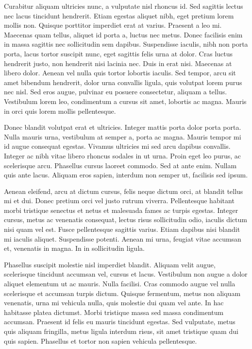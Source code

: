 Curabitur aliquam ultricies nunc, a vulputate nisl rhoncus id. Sed
sagittis lectus nec lacus tincidunt hendrerit. Etiam egestas aliquet
nibh, eget pretium lorem mollis non. Quisque porttitor imperdiet erat
at varius. Praesent a leo mi. Maecenas quam tellus, aliquet id porta
a, luctus nec metus. Donec facilisis enim in massa sagittis nec sollicitudin
sem dapibus. Suspendisse iaculis, nibh non porta porta, lacus tortor
suscipit nunc, eget sagittis felis urna at dolor. Cras luctus hendrerit
justo, non hendrerit nisi lacinia nec. Duis in erat nisi. Maecenas
at libero dolor. Aenean vel nulla quis tortor lobortis iaculis. Sed
tempor, arcu sit amet bibendum hendrerit, dolor urna convallis ligula,
quis volutpat lorem purus nec nisl. Sed eros augue, pulvinar eu posuere
consectetur, aliquam a tellus. Vestibulum lorem leo, condimentum a
cursus sit amet, lobortis ac magna. Mauris in orci quis lorem mollis
pellentesque.

Donec blandit volutpat erat et ultricies. Integer mattis porta dolor
porta porta. Nulla mauris urna, vestibulum at semper a, porta ac magna.
Mauris tempor mi id augue consequat egestas. Vivamus ultricies mi
sed arcu dapibus convallis. Integer ac nibh vitae libero rhoncus sodales
in ut urna. Proin eget leo purus, ac scelerisque arcu. Phasellus cursus
laoreet commodo. Sed at ante enim. Nullam quis ante lacus. Aliquam
eros sapien, interdum non semper ut, facilisis sed ipsum.

Aenean eleifend, arcu at dictum cursus, felis neque dictum orci, at
blandit tellus mi et dui. Donec pretium orci vel justo rutrum viverra.
Pellentesque habitant morbi tristique senectus et netus et malesuada
fames ac turpis egestas. Integer cursus, metus ac venenatis consequat,
lectus risus sollicitudin odio, iaculis dictum nisi quam vel est.
Fusce pellentesque sagittis varius. Etiam dapibus nisi blandit mi
iaculis aliquet. Suspendisse potenti. Aenean mi urna, feugiat vitae
accumsan et, venenatis in magna. In in sollicitudin ligula.

Phasellus suscipit molestie nisl imperdiet blandit. Aliquam velit
augue, scelerisque tincidunt accumsan vel, cursus et lacus. Vestibulum
non augue a dolor aliquet elementum ut ac mauris. Nulla facilisi.
Cras commodo augue vel nulla scelerisque et accumsan turpis dictum.
Quisque fermentum, metus non aliquam venenatis, urna mi vehicula nulla,
quis molestie dui quam vel ante. In hac habitasse platea dictumst.
Morbi tristique massa sed massa condimentum accumsan. Praesent id
felis eu mauris tincidunt egestas. Sed vulputate, metus quis aliquam
fringilla, metus ligula interdum risus, sit amet tristique quam dui
quis sapien. Phasellus et tortor non sapien vehicula pellentesque.

